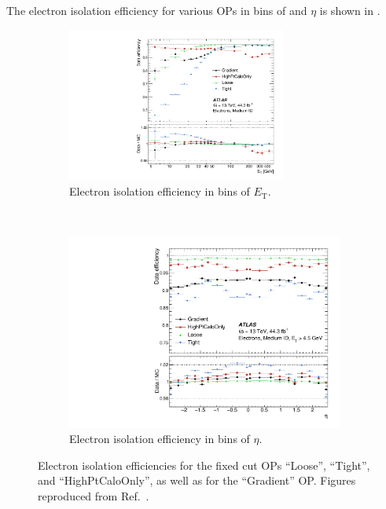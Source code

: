 The electron isolation efficiency for various OPs in bins of \pt and \(\eta\) is shown in .
\begin{figure}[htbp]
    \centering
    \begin{subfigure}{1.\textwidth}
      \centering
      \includegraphics[width=0.79\textwidth]{figures/methods/electron_iso_et.pdf}
      \caption{Electron isolation efficiency in bins of \(E_{\text{T}}\).}
      \label{fig:methods:event-reconstruction:electrons:isolation:et}
    \end{subfigure}
    \\
    \begin{subfigure}{1.\textwidth}
      \centering
      \includegraphics[width=.79\textwidth]{figures/methods/electron_iso_eta.pdf}
      \caption{Electron isolation efficiency in bins of \(\eta\).}
      \label{fig:methods:event-reconstruction:electrons:isolation:eta}
    \end{subfigure}
    \caption{Electron isolation efficiencies for the fixed cut OPs ``Loose'', ``Tight'', and ``HighPtCaloOnly'', as well as for the ``Gradient'' OP. Figures reproduced from Ref.~\cite{EGAM-2018-01}.}
    \label{fig:methods:event-reconstruction:electrons:isolation}
\end{figure}


